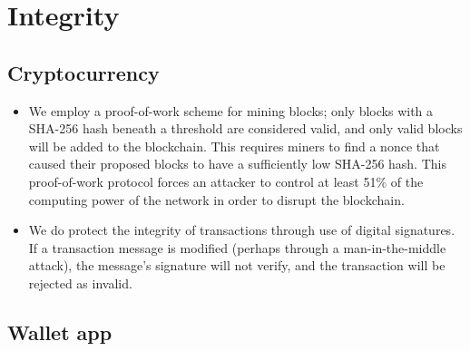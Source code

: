 \documentclass[a4paper,12pt]{article}
\begin{document}
\section{Integrity}

\subsection{Cryptocurrency}

\begin{itemize}
	\item We employ a proof-of-work scheme for mining blocks; only blocks with a SHA-256 hash beneath a threshold are considered valid, and only valid blocks will be added to the blockchain.
	This requires miners to find a nonce that caused their proposed blocks to have a sufficiently low SHA-256 hash.
	This proof-of-work protocol forces an attacker to control at least 51\% of the computing power of the network in order to disrupt the blockchain\cite{bitcoin}.
	\item We do protect the integrity of transactions through use of digital signatures.
	If a transaction message is modified (perhaps through a man-in-the-middle attack), the message's signature will not verify, and the transaction will be rejected as invalid.
\end{itemize}

\subsection{Wallet app}
\end{document}
